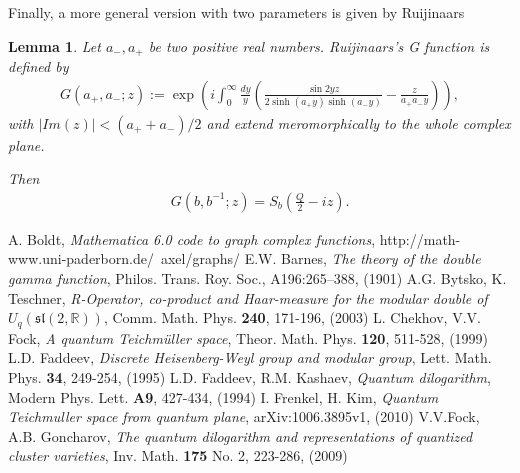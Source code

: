 \documentclass[10pt,reqno]{article}
\newtheorem{Lem}[Thm]{Lemma}
\def\R{\mathbb{R}}
\def\sl{\mathfrak{sl}}
\def\oo{\infty}
\def\inv{^{-1}}
\newcommand{\Eq}[1]{\begin{align}#1\end{align}}
\numberwithin{equation}{section}
\begin{document}
Finally, a more general version with two parameters is given by Ruijinaars \cite{Ru}
\begin{Lem} Let $a_-,a_+$ be two positive real numbers. Ruijinaars's G function is defined by
\Eq{G(a_+,a_-;z):=\exp\left(i\int_0^\oo \frac{dy}{y}\left(\frac{\sin 2yz}{2\sinh(a_+y)\sinh(a_-y)}-\frac{z}{a_+a_-y}\right)\right),}
with $|Im(z)|<(a_++a_-)/2$ and extend meromorphically to the whole complex plane.

Then \Eq{G(b,b\inv;z)=S_b(\frac{Q}{2}-iz).}
\end{Lem}

\begin{thebibliography}{99}

  A. Boldt,
  \textit{Mathematica 6.0 code to graph complex functions},
  http://math-www.uni-paderborn.de/~axel/graphs/
  E.W. Barnes,
  \textit{The theory of the double gamma function},
Philos. Trans. Roy. Soc., A196:265–388, (1901)
  A.G. Bytsko, K. Teschner,
  \textit{R-Operator, co-product and Haar-measure for the modular double of $U_q(\sl(2,\R))$},
  Comm. Math. Phys. \textbf{240}, 171-196,  (2003)
  L. Chekhov, V.V. Fock,
  \textit{A quantum Teichm\"{u}ller space},
  Theor. Math. Phys. \textbf{120}, 511-528, (1999)
  L.D. Faddeev,
  \textit{Discrete Heisenberg-Weyl group and modular group},
  Lett. Math. Phys. \textbf{34}, 249-254, (1995)  
  L.D. Faddeev, R.M. Kashaev,
  \textit{Quantum dilogarithm},
  Modern Phys. Lett. \textbf{A9}, 427-434, (1994)
  I. Frenkel, H. Kim,
  \textit{Quantum Teichmuller space from quantum plane},
  arXiv:1006.3895v1, (2010)
  V.V.Fock, A.B. Goncharov,
  \textit{The quantum dilogarithm and representations of quantized cluster varieties},
  Inv. Math. \textbf{175} No. 2, 223-286, (2009)  


\end{thebibliography}
\end{document}
